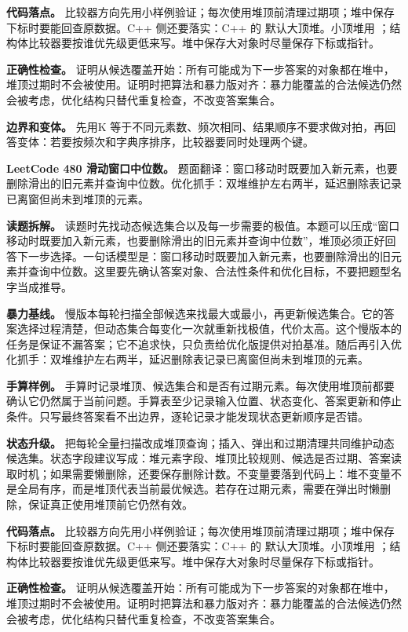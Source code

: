 \textbf{代码落点。} 比较器方向先用小样例验证；每次使用堆顶前清理过期项；堆中保存下标时要能回查原数据。C++ 侧还要落实：C++ 的  默认大顶堆。小顶堆用 ；结构体比较器要按谁优先级更低来写。堆中保存大对象时尽量保存下标或指针。

\textbf{正确性检查。} 证明从候选覆盖开始：所有可能成为下一步答案的对象都在堆中，堆顶过期时不会被使用。证明时把算法和暴力版对齐：暴力能覆盖的合法候选仍然会被考虑，优化结构只替代重复检查，不改变答案集合。

\textbf{边界和变体。} 先用K 等于不同元素数、频次相同、结果顺序不要求做对拍，再回答变体：若要按频次和字典序排序，比较器要同时处理两个键。

\noindent\textbf{LeetCode 480 滑动窗口中位数。} 题面翻译：窗口移动时既要加入新元素，也要删除滑出的旧元素并查询中位数。优化抓手：双堆维护左右两半，延迟删除表记录已离窗但尚未到堆顶的元素。

\textbf{读题拆解。} 读题时先找动态候选集合以及每一步需要的极值。本题可以压成“窗口移动时既要加入新元素，也要删除滑出的旧元素并查询中位数”，堆顶必须正好回答下一步选择。一句话模型是：窗口移动时既要加入新元素，也要删除滑出的旧元素并查询中位数。这里要先确认答案对象、合法性条件和优化目标，不要把题型名字当成推导。

\textbf{暴力基线。} 慢版本每轮扫描全部候选来找最大或最小，再更新候选集合。它的答案选择过程清楚，但动态集合每变化一次就重新找极值，代价太高。这个慢版本的任务是保证不漏答案；它不追求快，只负责给优化版提供对拍基准。随后再引入优化抓手：双堆维护左右两半，延迟删除表记录已离窗但尚未到堆顶的元素。

\textbf{手算样例。} 手算时记录堆顶、候选集合和是否有过期元素。每次使用堆顶前都要确认它仍然属于当前问题。手算表至少记录输入位置、状态变化、答案更新和停止条件。只写最终答案看不出边界，逐轮记录才能发现状态更新顺序是否错。

\textbf{状态升级。} 把每轮全量扫描改成堆顶查询；插入、弹出和过期清理共同维护动态候选集。状态字段建议写成：堆元素字段、堆顶比较规则、候选是否过期、答案读取时机；如果需要懒删除，还要保存删除计数。不变量要落到代码上：堆不变量不是全局有序，而是堆顶代表当前最优候选。若存在过期元素，需要在弹出时懒删除，保证真正使用堆顶前它仍然有效。

\textbf{代码落点。} 比较器方向先用小样例验证；每次使用堆顶前清理过期项；堆中保存下标时要能回查原数据。C++ 侧还要落实：C++ 的  默认大顶堆。小顶堆用 ；结构体比较器要按谁优先级更低来写。堆中保存大对象时尽量保存下标或指针。

\textbf{正确性检查。} 证明从候选覆盖开始：所有可能成为下一步答案的对象都在堆中，堆顶过期时不会被使用。证明时把算法和暴力版对齐：暴力能覆盖的合法候选仍然会被考虑，优化结构只替代重复检查，不改变答案集合。

